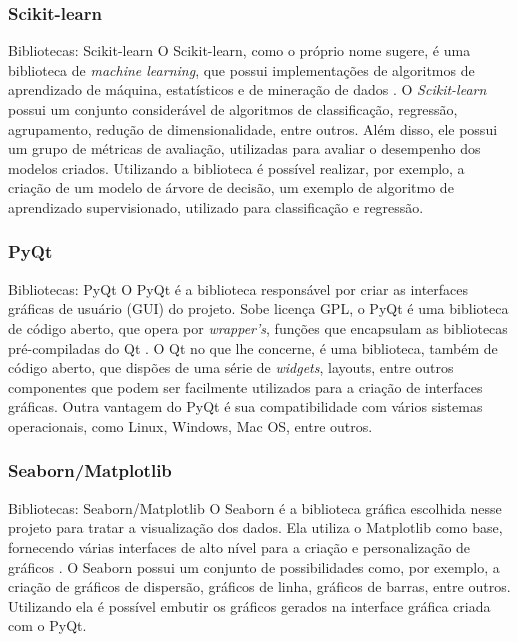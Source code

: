 \subsubsection{Scikit-learn}
\label{subsubsec:scikit-learn}

\begin{frame}{Bibliotecas: Scikit-learn}
	O Scikit-learn, como o próprio nome sugere, é uma biblioteca de \textit{machine learning}, que possui implementações de algoritmos de aprendizado de máquina, estatísticos e de mineração de dados \cite{scikit-learn2022}. O \textit{Scikit-learn} possui um conjunto considerável de algoritmos de classificação, regressão, agrupamento, redução de dimensionalidade, entre outros. Além disso, ele possui um grupo de métricas de avaliação, utilizadas para avaliar o desempenho dos modelos criados. Utilizando a biblioteca é possível realizar, por exemplo, a criação de um modelo de árvore de decisão, um exemplo de algoritmo de aprendizado supervisionado, utilizado para classificação e regressão.
\end{frame}


\subsubsection{PyQt}
\label{subsubsec:pyqt}

\begin{frame}{Bibliotecas: PyQt}
	O PyQt é a biblioteca responsável por criar as interfaces gráficas de usuário (GUI) do projeto. Sobe licença GPL, o PyQt é uma biblioteca de código aberto, que opera por \textit{wrapper's}, funções que encapsulam as bibliotecas pré-compiladas do Qt \cite{pyqt}. O Qt no que lhe concerne, é uma biblioteca, também de código aberto, que dispões de uma série de \textit{widgets}, layouts, entre outros componentes que podem ser facilmente utilizados para a criação de interfaces gráficas. Outra vantagem do PyQt é sua compatibilidade com vários sistemas operacionais, como Linux, Windows, Mac OS, entre outros.
\end{frame}

\subsubsection{Seaborn/Matplotlib}
\label{subsubsec:seaborn}

\begin{frame}{Bibliotecas: Seaborn/Matplotlib}
	O Seaborn é a biblioteca gráfica escolhida nesse projeto para tratar a visualização dos dados. Ela utiliza o Matplotlib como base, fornecendo várias interfaces de alto nível para a criação e personalização de gráficos \cite{seaborn}. O Seaborn possui um conjunto de possibilidades como, por exemplo, a criação de gráficos de dispersão, gráficos de linha, gráficos de barras, entre outros. Utilizando ela é possível embutir os gráficos gerados na interface gráfica criada com o PyQt.
\end{frame}


